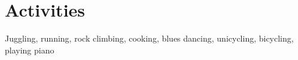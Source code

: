 \documentclass[letterpaper,11pt]{article}
\newcommand{\resumeSubHeadingListStart}{}
\newcommand{\resumeSubHeadingListEnd}{}
\begin{document}
\section{Activities}
    \resumeSubHeadingListStart
    \item Juggling, running, rock climbing, cooking, blues dancing, unicycling, bicycling, playing piano
  \resumeSubHeadingListEnd
\end{document}
